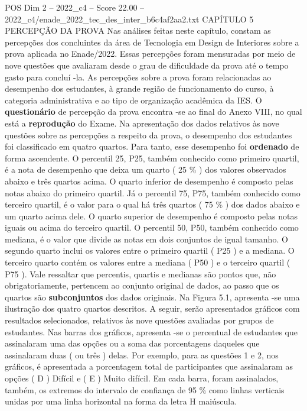 \begin{textsample}{POS Dim 2 – 2022\_c4 – Score 22.00 – 2022\_c4/enade\_2022\_tec\_des\_inter\_b6c4af2aa2.txt}  \label{ex:f2_pos_026}
CAPÍTULO 5 PERCEPÇÃO DA PROVA Nas análises feitas neste capítulo, constam as percepções dos concluintes da área de Tecnologia em Design de Interiores sobre a prova aplicada no Enade/2022.
Essas percepções foram mensuradas por meio de nove questões que avaliaram desde o grau de dificuldade da prova até o tempo gasto para concluí -la.
As percepções sobre a prova foram relacionadas ao desempenho dos estudantes, à grande região de funcionamento do curso, à categoria administrativa e ao tipo de organização acadêmica da IES.
O \textbf{questionário} de percepção da prova encontra -se ao final do Anexo VIII, no qual está a \textbf{reprodução} do Exame.
Na apresentação dos dados relativos às nove questões sobre as percepções a respeito da prova, o desempenho dos estudantes foi classificado em quatro quartos.
Para tanto, esse desempenho foi \textbf{ordenado} de forma ascendente.
O percentil 25, P25, também conhecido como primeiro quartil, é a nota de desempenho que deixa um quarto ( 25 \% ) dos valores observados abaixo e três quartos acima.
O quarto inferior de desempenho é composto pelas notas abaixo do primeiro quartil.
Já o percentil 75, P75, também conhecido como terceiro quartil, é o valor para o qual há três quartos ( 75 \% ) dos dados abaixo e um quarto acima dele.
O quarto superior de desempenho é composto pelas notas iguais ou acima do terceiro quartil.
O percentil 50, P50, também conhecido como mediana, é o valor que divide as notas em dois conjuntos de igual tamanho.
O segundo quarto inclui os valores entre o primeiro quartil ( P25 ) e a mediana.
O terceiro quarto contém os valores entre a mediana ( P50 ) e o terceiro quartil ( P75 ).
Vale ressaltar que percentis, quartis e medianas são pontos que, não obrigatoriamente, pertencem ao conjunto original de dados, ao passo que os quartos são \textbf{subconjuntos} dos dados originais.
Na Figura 5.1, apresenta -se uma ilustração dos quatro quartos descritos.
A seguir, serão apresentados gráficos com resultados selecionados, relativos às nove questões avaliadas por grupos de estudantes.
Nas barras dos gráficos, apresenta -se o percentual de estudantes que assinalaram uma das opções ou a soma das porcentagens daqueles que assinalaram duas ( ou três ) delas.
Por exemplo, para as questões 1 e 2, nos gráficos, é apresentada a porcentagem total de participantes que assinalaram as opções ( D ) Difícil e ( E ) Muito difícil.
Em cada barra, foram assinalados, também, os extremos do intervalo de confiança de 95 \% como linhas verticais unidas por uma linha horizontal na forma da letra H maiúscula.

\end{textsample}

